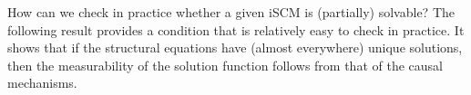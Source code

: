 How can we check in practice whether a given iSCM is (partially) solvable?
The following result provides a condition that is relatively easy to check in practice.
It shows that if the structural equations have (almost everywhere) unique solutions, then the measurability of the solution function follows from that of the causal mechanisms.

